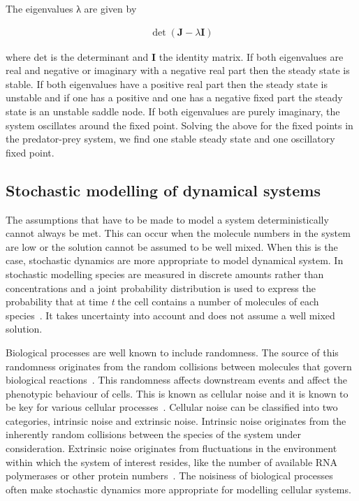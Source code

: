 \noindent The eigenvalues λ are given by

\begin{align}
\det(\mathbf{J} - λ\mathbf{I})
\end{align}

\noindent where det is the determinant and \textbf{I} the identity matrix. If both eigenvalues are real and negative or imaginary with a negative real part then the steady state is stable. If both eigenvalues have a positive real part then the steady state is unstable and if one has a positive and one has a negative fixed part the steady state is an unstable saddle node. If both eigenvalues are purely imaginary, the system oscillates around the fixed point. Solving the above for the fixed points in the predator-prey system, we find one stable steady state and one oscillatory fixed point. 

\subsection{Stochastic modelling of dynamical systems}

The assumptions that have to be made to model a system deterministically cannot always be met. This can occur when the molecule numbers in the system are low or the solution cannot be assumed to be well mixed. When this is the case, stochastic dynamics are more appropriate to model dynamical system. In stochastic modelling species are measured in discrete amounts rather than concentrations and a joint probability distribution is used to express the probability that at time \textit{t} the cell contains a number of molecules of each species~\autocite{deJong:2002ft,khamash_iglesias:2010}. It takes uncertainty into account and does not assume a well mixed solution. 

Biological processes are well known to include randomness. The source of this randomness originates from the random collisions between molecules that govern biological reactions~\autocite{khamash_iglesias:2010}. This randomness affects downstream events and affect the phenotypic behaviour of cells. This is known as cellular noise and it is known to be key for various cellular processes~\autocite{Eldar:2010kk}. Cellular noise can be classified into two categories, intrinsic noise and extrinsic noise. Intrinsic noise originates from the inherently random collisions between the species of the system under consideration. Extrinsic noise originates from fluctuations in the environment within which the system of interest resides, like the number of available RNA polymerases or other protein numbers~\autocite{khamash_iglesias:2010}. The noisiness of biological processes often make stochastic dynamics more appropriate for modelling cellular systems.  


